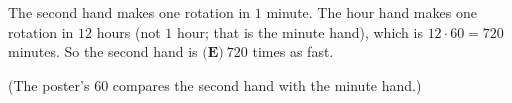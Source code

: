 The second hand makes one rotation in $1$ minute. The hour hand makes one rotation in $12$ hours (not $1$ hour; that is the minute hand), which is $12\cdot60=720$ minutes. So the second hand is $\boxed{\textbf{(E)}\ 720}$ times as fast.

(The poster's $60$ compares the second hand with the minute hand.)
